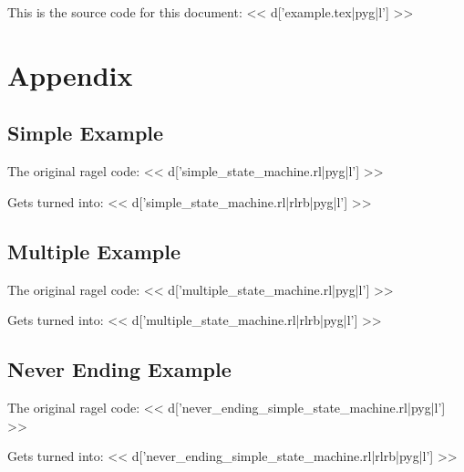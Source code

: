 \documentclass[a4paper]{article}
\begin{document}
This is the source code for this document:
<< d['example.tex|pyg|l'] >>

\section{Appendix}

\subsection{Simple Example}
The original ragel code:
<< d['simple_state_machine.rl|pyg|l'] >>

Gets turned into:
<< d['simple_state_machine.rl|rlrb|pyg|l'] >>

\subsection{Multiple Example}
The original ragel code:
<< d['multiple_state_machine.rl|pyg|l'] >>

Gets turned into:
<< d['multiple_state_machine.rl|rlrb|pyg|l'] >>

\subsection{Never Ending Example}
The original ragel code:
<< d['never_ending_simple_state_machine.rl|pyg|l'] >>

Gets turned into:
<< d['never_ending_simple_state_machine.rl|rlrb|pyg|l'] >>
\end{document}
